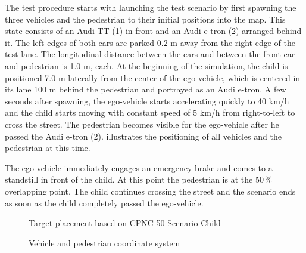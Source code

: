 The test procedure starts with launching the test scenario by first spawning the three vehicles and the pedestrian to their initial positions into the map. This state consists of an Audi TT (1) in front and an Audi e-tron (2) arranged behind it. The left edges of both cars are parked 0.2 m away from the right edge of the test lane. The longitudinal distance between the cars and between the front car and pedestrian is 1.0 m, each. At the beginning of the simulation, the child is positioned 7.0 m laterally from the center of the ego-vehicle, which is centered in its lane 100 m behind the pedestrian and portrayed as an Audi e-tron. A few seconds after spawning, the ego-vehicle starts accelerating quickly to 40 km/h and the child starts moving with constant speed of 5 km/h from right-to-left to cross the street. The pedestrian becomes visible for the ego-vehicle after he passed the Audi e-tron (2).  illustrates the positioning of all vehicles and the pedestrian at this time.

The ego-vehicle immediately engages an emergency brake and comes to a standstill in front of the child. At this point the pedestrian is at the 50\,\% overlapping point. The child continues crossing the street and the scenario ends as soon as the child completely passed the ego-vehicle.
\begin{figure}[b]
	\centering
	\caption{Target placement based on CPNC-50 Scenario Child \cite{Protocoll}}
	\label{fig:coordination}
\end{figure}

\begin{figure}[b]
	\centering
	\caption{Vehicle and pedestrian coordinate system \cite{Aeberhard}}
	\label{fig:coordinate}
\end{figure}
